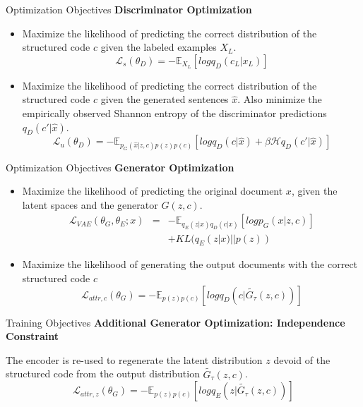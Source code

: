 \documentclass{beamer}
\begin{document}
\begin{frame}{Optimization Objectives}
  \textbf{Discriminator Optimization}

  \begin{itemize}
    \item Maximize the likelihood of predicting the correct distribution of the structured code $c$ given the labeled examples $X_L$.
    \begin{equation*}
      \mathcal{L}_s(\theta_D) = - \mathbb{E}_{X_L}[log q_D(c_L|x_L)]
    \end{equation*}
    \item Maximize the likelihood of predicting the correct distribution of the structured code $c$ given the generated sentences $\hat{x}$. Also minimize the empirically observed Shannon entropy of the discriminator predictions $q_D(c'|\hat{x})$.
    \begin{equation*}
      \mathcal{L}_u(\theta_D) = - \mathbb{E}_{p_G(\hat{x}|z,c)p(z)p(c)}
      [log q_D(c|\hat{x}) + \beta \mathcal{H} q_D(c'|\hat{x})]
    \end{equation*}
  \end{itemize}
\end{frame}

\begin{frame}{Optimization Objectives}
  \textbf{Generator Optimization}

  \begin{itemize}
    \item Maximize the likelihood of predicting the original document $x$, given the latent spaces and the generator $G(z,c)$.
      \begin{eqnarray*}
        \mathcal{L}_{VAE}(\theta_G, \theta_E; x) &=&
        - \mathbb{E}_{q_E(z|x)q_D(c|x)}[log p_G(x|z,c)] \\ & &
        + KL(q_E(z|x)||p(z))
      \end{eqnarray*}
    \item Maximize the likelihood of generating the output documents with the correct structured code $c$
    \begin{equation*}
      \mathcal{L}_{attr, c}(\theta_G) = - \mathbb{E}_{p(z)p(c)}
      [log q_D(c|\tilde{G_{\tau}}(z,c))]
    \end{equation*}
  \end{itemize}
\end{frame}

\begin{frame}{Training Objectives}
  \textbf{Additional Generator Optimization: Independence Constraint}

  The encoder is re-used to regenerate the latent distribution $z$ devoid of the structured code from the output distribution $\tilde{G_{\tau}}(z,c)$.
  \begin{equation*}
    \mathcal{L}_{attr, z}(\theta_G) = - \mathbb{E}_{p(z)p(c)}
    [log q_E(z|\tilde{G_{\tau}}(z,c))]
  \end{equation*}
\end{frame}
\end{document}
